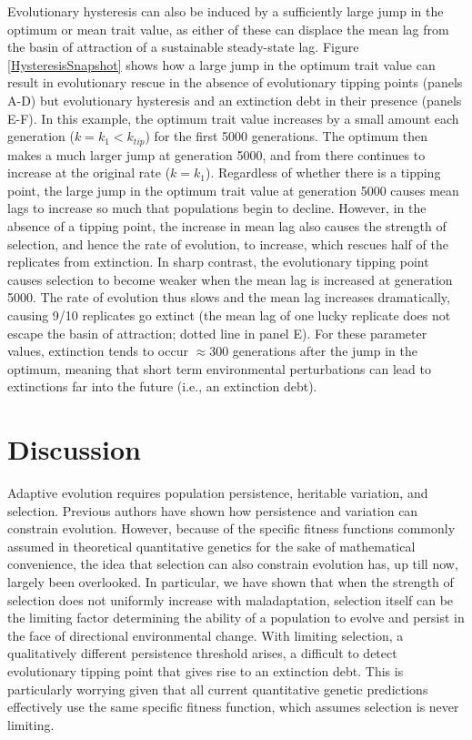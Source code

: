 \documentclass[12pt,letterpaper]{article} %
\begin{document}
Evolutionary hysteresis can also be induced by a sufficiently large jump in the optimum or mean trait value, as either of these can displace the mean lag from the basin of attraction of a sustainable steady-state lag.  
Figure \ref{HysteresisSnapshot} shows how a large jump in the optimum trait value can result in evolutionary rescue in the absence of evolutionary tipping points (panels A-D) but evolutionary hysteresis and an extinction debt in their presence (panels E-F).
In this example, the optimum trait value increases by a small amount each generation ($k=k_1<k_{tip}$) for the first 5000 generations.
The optimum then makes a much larger jump at generation 5000, and from there continues to increase at the original rate ($k=k_1$).   
Regardless of whether there is a tipping point, the large jump in the optimum trait value at generation 5000 causes mean lags to increase so much that populations begin to decline.
However, in the absence of a tipping point, the increase in mean lag also causes the strength of selection, and hence the rate of evolution, to increase, which rescues half of the replicates from extinction.
In sharp contrast, the evolutionary tipping point causes selection to become weaker when the mean lag is increased at generation 5000.
The rate of evolution thus slows and the mean lag increases dramatically, causing 9/10 replicates go extinct (the mean lag of one lucky replicate does not escape the basin of attraction; dotted line in panel E).
For these parameter values, extinction tends to occur $\approx300$ generations after the jump in the optimum, meaning that short term environmental perturbations can lead to extinctions far into the future (i.e., an extinction debt). 

\section*{Discussion}

Adaptive evolution requires population persistence, heritable variation, and selection.
Previous authors have shown how persistence \citep[e.g.,][]{Lynch1993,Burger1995} and variation \citep{Gomulkiewicz2009} can constrain evolution.
However, because of the specific fitness functions commonly assumed in theoretical quantitative genetics for the sake of mathematical convenience, the idea that selection can also constrain evolution has, up till now, largely been overlooked. 
In particular, we have shown that when the strength of selection does not uniformly increase with maladaptation, selection itself can be the limiting factor determining the ability of a population to evolve and persist in the face of directional environmental change.
With limiting selection, a qualitatively different persistence threshold arises, a difficult to detect evolutionary tipping point that gives rise to an extinction debt.
This is particularly worrying given that all current quantitative genetic predictions effectively use the same specific fitness function, which assumes selection is never limiting.
\end{document}
